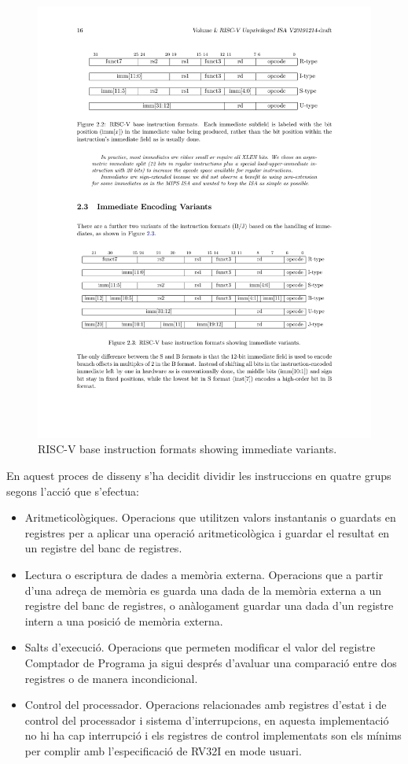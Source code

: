 \documentclass[10pt,a4paper,twocolumn,twoside]{article}
\begin{document}
    \begin{figure}[!h]
    \centering
    	\includegraphics[width=\linewidth]{pdf/Encoding.pdf}
        \caption{RISC-V base instruction formats showing immediate variants.}
        \label{fig:baseinstformatsimm}
    \end{figure}
    
    En aquest proces de disseny s'ha decidit dividir les instruccions en quatre grups segons l'acció que s'efectua:
    
    \begin{itemize}
        \item Aritmeticològiques. Operacions que utilitzen valors instantanis o guardats en registres per a aplicar una operació aritmeticològica i guardar el resultat en un registre del banc de registres.
        \item Lectura o escriptura de dades a memòria externa. Operacions que a partir d'una adreça de memòria es guarda una dada de la memòria externa a un registre del banc de registres, o anàlogament guardar una dada d'un registre intern a una posició de memòria externa.
        \item Salts d'execució. Operacions que permeten modificar el valor del registre Comptador de Programa ja sigui després d'avaluar una comparació entre dos registres o de manera incondicional.
        \item Control del processador. Operacions relacionades amb registres d'estat i de control del processador i sistema d'interrupcions, en aquesta implementació no hi ha cap interrupció i els registres de control implementats son els mínims per complir amb l'especificació de RV32I en mode usuari.
    \end{itemize}
        
\end{document}
